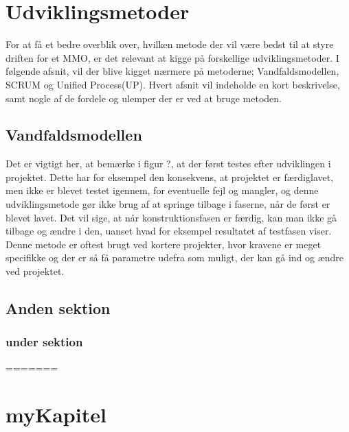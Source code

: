 \chapter{Udviklingsmetoder}
For at få et bedre overblik over, hvilken metode der vil være bedst til at styre driften for et MMO, er det relevant at kigge på forskellige udviklingsmetoder. I følgende afsnit, vil der blive kigget nærmere på metoderne; Vandfaldsmodellen, SCRUM og Unified Process(UP). Hvert afsnit vil indeholde en kort beskrivelse, samt nogle af de fordele og ulemper der er ved at bruge metoden.\\

\section{Vandfaldsmodellen}
Det er vigtigt her, at bemærke i figur ?, at der først testes efter udviklingen i projektet. 
Dette har for eksempel den konsekvens, at projektet er færdiglavet, men ikke er blevet testet igennem, for eventuelle fejl og mangler, og denne udviklingsmetode gør ikke brug af at springe tilbage i faserne, når de først er blevet lavet. 
Det vil sige, at når konstruktionsfasen er færdig, kan man ikke gå tilbage og ændre i den, uanset hvad for eksempel resultatet af testfasen viser. 
Denne metode er oftest brugt ved kortere projekter, hvor kravene er meget specifikke og der er så få parametre udefra som muligt, der kan gå ind og ændre ved projektet.\\
\section{Anden sektion}

\subsection{under sektion}
=======
\cfoot{\page\textbackslash \totalp} %
\chapter{myKapitel}


